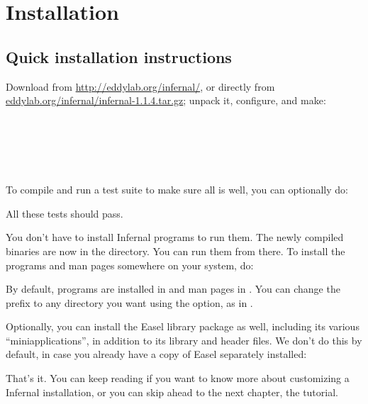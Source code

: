 \section{Installation}
\label{section:installation}
\setcounter{footnote}{0}

\subsection{Quick installation instructions}

Download  from \url{http://eddylab.org/infernal/}, or
directly from \\
\url{eddylab.org/infernal/infernal-1.1.4.tar.gz};
unpack it, configure, and make:

\\
\\
\\
\\ 

To compile and run a test suite to make sure all is well, you can
optionally do:


All these tests should pass.

You don't have to install Infernal programs to run them. The newly
compiled binaries are now in the  directory. You can run
them from there. To install the programs and man pages somewhere on
your system, do:


By default, programs are installed in  and man
pages in . You can change the
 prefix to any directory you want using the
 option, as in .

Optionally, you can install the Easel library package as well,
including its various ``miniapplications'', in addition to its library
and header files. We don't do this by default, in case you already
have a copy of Easel separately installed:


That's it.  You can keep reading if you want to know more about
customizing a Infernal installation, or you can skip ahead to the next
chapter, the tutorial.

